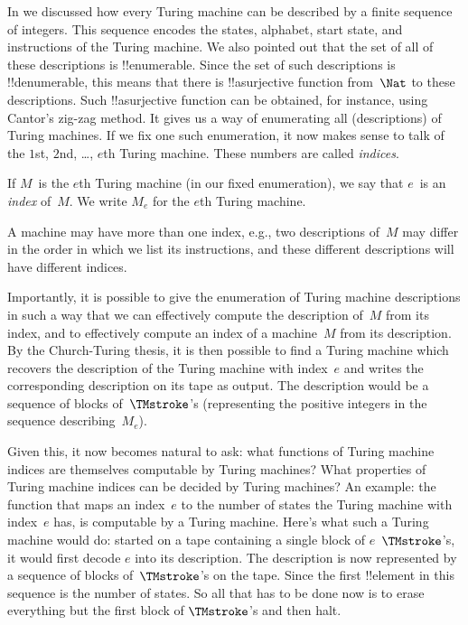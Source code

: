 \documentclass[../../../include/open-logic-section]{subfiles}
\begin{document}

In  we discussed how every Turing machine can be
described by a finite sequence of integers. This sequence encodes the
states, alphabet, start state, and instructions of the Turing machine.
We also pointed out that the set of all of these descriptions is
!!{enumerable}. Since the set of such descriptions is !!{denumerable},
this means that there is !!a{surjective} function from~$\Nat$ to
these descriptions. Such !!a{surjective} function can be obtained, for
instance, using Cantor's zig-zag method.  It gives us a way of
enumerating all (descriptions) of Turing machines. If we fix one such
enumeration, it now makes sense to talk of the $1$st, $2$nd, \dots,
$e$th Turing machine.  These numbers are called \emph{indices}.

\begin{defn}
If $M$~is the $e$th Turing machine (in our fixed enumeration), we
say that $e$~is an \emph{index} of~$M$. We write $M_e$ for the $e$th
Turing machine.
\end{defn}

A machine may have more than one index, e.g., two descriptions of~$M$
may differ in the order in which we list its instructions, and these
different descriptions will have different indices.

Importantly, it is possible to give the enumeration of Turing machine
descriptions in such a way that we can effectively compute the
description of~$M$ from its index, and to effectively compute an index
of a machine~$M$ from its description.  By the Church-Turing thesis,
it is then possible to find a Turing machine which recovers the
description of the Turing machine with index~$e$ and writes the
corresponding description on its tape as output. The description would
be a sequence of blocks of~$\TMstroke$'s (representing the positive
integers in the sequence describing~$M_e$).

Given this, it now becomes natural to ask: what functions of Turing
machine indices are themselves computable by Turing machines? What
properties of Turing machine indices can be decided by Turing
machines?  An example: the function that maps an index~$e$ to the
number of states the Turing machine with index~$e$ has, is computable
by a Turing machine. Here's what such a Turing machine would do:
started on a tape containing a single block of $e$~$\TMstroke$'s, it
would first decode $e$ into its description. The description is now
represented by a sequence of blocks of~$\TMstroke$'s on the tape.
Since the first !!{element} in this sequence is the number of states.
So all that has to be done now is to erase everything but the first
block of $\TMstroke$'s and then halt.
\end{document}
